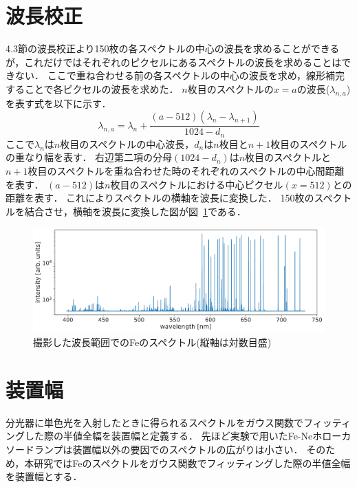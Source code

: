 \section{波長校正}
4.3節の波長校正より150枚の各スペクトルの中心の波長を求めることができるが，これだけではそれぞれのピクセルにあるスペクトルの波長を求めることはできない．
ここで重ね合わせる前の各スペクトルの中心の波長を求め，線形補完することで各ピクセルの波長を求めた．
$n$枚目のスペクトルの$x=a$の波長($\lambda_{n,a}$)を表す式を以下に示す．
\begin{equation}
     \lambda_{n,a} = \lambda_n + \frac{(a-512)(\lambda_n-\lambda_{n+1})}{1024-d_n} 
\end{equation}
ここで$\lambda_n$は$n$枚目のスペクトルの中心波長，$d_n$は$n$枚目と$n+1$枚目のスペクトルの重なり幅を表す．
右辺第二項の分母$(1024-d_n)$は$n$枚目のスペクトルと$n+1$枚目のスペクトルを重ね合わせた時のそれぞれのスペクトルの中心間距離を表す．
$(a-512)$は$n$枚目のスペクトルにおける中心ピクセル$(x=512)$との距離を表す．
これによりスペクトルの横軸を波長に変換した．
150枚のスペクトルを結合させ，横軸を波長に変換した図が図\ \ref{fig:fe_wide_range}である．
\begin{figure}[htbp]
    \centering
    \includegraphics[scale=0.5]{figure/fe_wide_range.pdf}
    \caption{撮影した波長範囲でのFeのスペクトル(縦軸は対数目盛)}
    \label{fig:fe_wide_range}
\end{figure}

\section{装置幅}
分光器に単色光を入射したときに得られるスペクトルをガウス関数でフィッティングした際の半値全幅を装置幅と定義する．
先ほど実験で用いたFe-Neホローカソードランプは装置幅以外の要因でのスペクトルの広がりは小さい．
そのため，本研究ではFeのスペクトルをガウス関数でフィッティングした際の半値全幅を装置幅とする．

